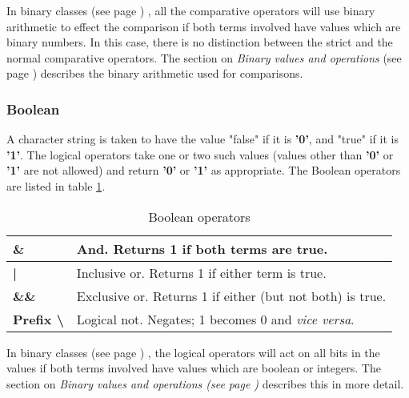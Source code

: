 In  binary classes (see page \pageref{refbincla}) , all the comparative operators
will use binary arithmetic to effect the comparison if both terms
involved have values which are binary numbers.
In this case, there is no distinction between the strict and the normal
comparative operators.
The section on  \emph{Binary values and operations} (see page \pageref{refbinary}) 
describes the binary arithmetic used for comparisons.
\subsubsection{Boolean}
\index{,}
A character string is taken to have the value "false" if it
is \textbf{'0'}, and "true" if it is \textbf{'1'}.
The logical operators take one or two such values (values other
than \textbf{'0'} or \textbf{'1'} are not allowed) and
return \textbf{'0'} or \textbf{'1'} as appropriate. The Boolean
operators are listed in table \ref{table:Boolean Comparators}.
\begin{table}\caption{Boolean operators}\label{table:Boolean Comparators}
\begin{tabularx}{\textwidth}{>{\bfseries}lX}
\toprule
\&&And. Returns 1 if both terms are true.
\\\midrule
|&Inclusive or. Returns 1 if either term is true.
\\\midrule
\&\&&Exclusive or. Returns 1 if either (but not both) is true.
\\\midrule
Prefix \textbackslash &Logical not. Negates; 1 becomes 0 and
\emph{vice versa}.
\\\bottomrule
\end{tabularx}
\end{table}
In  binary classes (see page \pageref{refbincla}) , the logical operators will act on
all bits in the values if both terms involved have values which are
boolean or integers.
The section on  \emph{Binary values and operations (see page
  \pageref{refbinary})} describes this in more detail.

